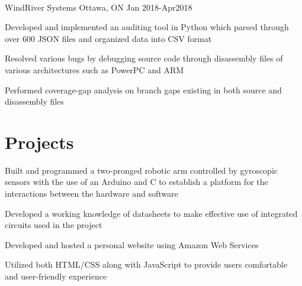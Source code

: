 \documentclass[]{deedy-resume-openfont}
\begin{document}
\begin{minipage}[t]{0.66\textwidth}
\begin{tightemize}
\end{tightemize}
\vspace{0.5em}
\\
{WindRiver Systems \textbullet{} Ottawa, ON \textbullet{} Jan 2018-Apr2018}
\begin{tightemize}
\item Developed and implemented an auditing tool in Python which parsed through over 600 JSON files and
organized data into CSV format 
\item Resolved various bugs by debugging source code through disassembly files of various architectures such as
PowerPC and ARM 
\item Performed coverage-gap analysis on branch gaps existing in both source and disassembly files 

\end{tightemize}



\section{Projects}
\vspace{0.5em}
\begin{tightemize}
\item Built and programmed a two-pronged robotic arm controlled by gyroscopic sensors with the use of an Arduino
and C to establish a platform for the interactions between the hardware and software \\
\item Developed a working knowledge of datasheets to make effective use of integrated circuits used in the project 
\end{tightemize}
\sectionsep

 {\href{https://github.com/HBaig30/hamzais.me}{{\faGithub}}
\begin{tightemize}
\item Developed and hosted a personal website using Amazon Web Services  
\item Utilized both HTML/CSS along with JavaScript to provide users comfortable and user-friendly experience
\end{tightemize}
\sectionsep

}
\end{minipage}
\end{document}
